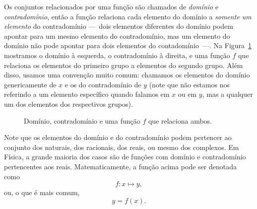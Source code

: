 Os conjuntos relacionados por uma função são chamados de \emph{domínio} e \emph{contradomínio}, então a função relaciona cada elemento do domínio a \emph{somente um elemento} do contradomínio ---~dois elementos diferentes do domínio podem apontar para um mesmo elemento do contradomínio, mas um elemento do domínio não pode apontar para dois elementos do contadomínio~---. Na Figura~\ref{Fig:Funcao} mostramos o domínio à esquerda, o contradomínio à direita, e uma função $f$ que relaciona os elementos do primeiro grupo a elementos do segundo grupo. Além disso, usamos uma convenção muito comum: chamamos os elementos do domínio genericamente de $x$ e os do contradomínio de $y$ (note que não estamos nos referindo a um elemento específico quando falamos em $x$ ou em $y$, mas a qualquer um dos elementos dos respectivos grupos).
\begin{figure}[h]
\centering
{}
\caption{Domínio, contradomínio e uma função $f$ que relaciona ambos.\label{Fig:Funcao}}
\end{figure}

Note que os elementos do domínio e do contradomínio podem pertencer ao conjunto dos naturais, dos racionais, dos reais, ou mesmo dos complexos. Em Física, a grande maioria dos casos são de funções com domínio e contradomínio pertencentes aos reais. Matematicamente, a função acima pode ser denotada como
\begin{equation}
    f: x \mapsto y,
\end{equation}
%
ou, o que é mais comum,
\begin{equation}
    y = f(x).
\end{equation}

